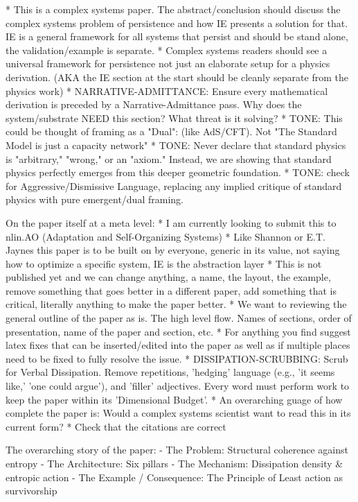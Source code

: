 * This is a complex systems paper. The abstract/conclusion should discuss the complex systems problem of persistence and how IE presents a solution for that. IE is a general framework for all systems that persist and should be stand alone, the validation/example is separate. 
* Complex systems readers should see a universal framework for persistence not just an elaborate setup for a physics derivation.  (AKA the IE section at the start should be cleanly separate from the physics work)
* NARRATIVE-ADMITTANCE: Ensure every mathematical derivation is preceded by a Narrative-Admittance pass. Why does the system/substrate NEED this section? What threat is it solving?
* TONE: This could be thought of framing as a "Dual": (like AdS/CFT). Not "The Standard Model is just a capacity network" 
* TONE: Never declare that standard physics is "arbitrary," "wrong," or an "axiom." Instead, we are showing that standard physics perfectly emerges from this deeper geometric foundation.
* TONE: check for Aggressive/Dismissive Language, replacing any implied critique of standard physics with pure emergent/dual framing.

On the paper itself at a meta level:
* I am currently looking to submit this to nlin.AO (Adaptation and Self-Organizing Systems)
* Like Shannon or E.T. Jaynes this paper is to be built on by everyone, generic in its value, not saying how to optimize a specific system, IE is the abstraction layer
* This is not published yet and we can change anything, a name, the layout, the example, remove something that goes better in a different paper, add something that is critical, literally anything to make the paper better.
* We want to reviewing the general outline of the paper as is.  The high level flow.  Names of sections, order of presentation, name of the paper and section, etc.
* For anything you find suggest latex fixes that can be inserted/edited into the paper as well as if multiple places need to be fixed to fully resolve the issue.
* DISSIPATION-SCRUBBING: Scrub for Verbal Dissipation. Remove repetitions, 'hedging' language (e.g., 'it seems like,' 'one could argue'), and 'filler' adjectives. Every word must perform work to keep the paper within its 'Dimensional Budget'.
* An overarching guage of how complete the paper is: Would a complex systems scientist want to read this in its current form? 
* Check that the citations are correct

The overarching story of the paper:
- The Problem: Structural coherence against entropy
- The Architecture: Six pillars
- The Mechanism: Dissipation density & entropic action 
- The Example / Consequence: The Principle of Least action as survivorship